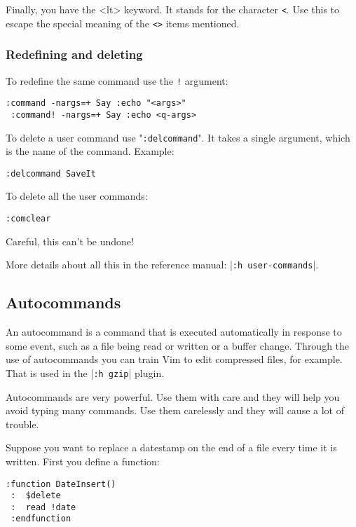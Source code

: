 Finally, you have the <lt> keyword.
It stands for the character \verb!<!.
Use this to escape the special meaning of the \verb!<>! items mentioned.

\subsubsection{Redefining and deleting}
To redefine the same command use the \verb:!: argument:

\begin{Verbatim}[samepage=true]
 :command -nargs=+ Say :echo "<args>"
 :command! -nargs=+ Say :echo <q-args>
\end{Verbatim}

To delete a user command use "\verb!:delcommand!".
It takes a single argument, which is the name of the command.
Example:

\begin{Verbatim}[samepage=true]
 :delcommand SaveIt
\end{Verbatim}

To delete all the user commands:

\begin{Verbatim}[samepage=true]
 :comclear
\end{Verbatim}

Careful, this can't be undone!

More details about all this in the reference manual: |\verb!:h user-commands!|.
\subsection{Autocommands}
\label{Autocommands}
An autocommand is a command that is executed automatically in response to some event, such as a file being read or written or a buffer change.
Through the use of autocommands you can train Vim to edit compressed files, for example.
That is used in the |\verb!:h gzip!| plugin.

Autocommands are very powerful.
Use them with care and they will help you avoid typing many commands.
Use them carelessly and they will cause a lot of trouble.

Suppose you want to replace a datestamp on the end of a file every time it is written.
First you define a function:

\begin{Verbatim}[samepage=true]
 :function DateInsert()
 :  $delete
 :  read !date
 :endfunction
\end{Verbatim}

